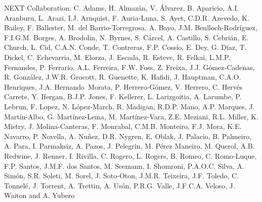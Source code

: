 NEXT Collaboration: C. Adams, H. Almaz\'an, V. \'Alvarez, B. Aparicio, A.I. Aranburu, L. Arazi, I.J. Arnquist, F. Auria-Luna, S. Ayet, C.D.R. Azevedo, K. Bailey, F. Ballester, M. del Barrio-Torregrosa, A. Bayo, J.M. Benlloch-Rodr\'{i}guez, F.I.G.M. Borges, A. Brodolin, N. Byrnes, S. C\'arcel, A. Castillo, S. Cebri\'an, E. Church, L. Cid, C.A.N. Conde, T. Contreras, F.P. Coss\'io, E. Dey, G. D\'iaz, T. Dickel, C. Echevarria, M. Elorza, J. Escada, R. Esteve, R. Felkai, L.M.P. Fernandes, P. Ferrario, A.L. Ferreira, F.W. Foss, Z. Freixa, J.J. G\'omez-Cadenas, R. Gonz\'alez, J.W.R. Grocott, R. Guenette, K. Hafidi, J. Hauptman, C.A.O. Henriques, J.A. Hernando~Morata, P. Herrero-G\'omez, V. Herrero, C. Herv\'es Carrete, Y. Ifergan, B.J.P. Jones, F. Kellerer, L. Larizgoitia, A. Larumbe, P. Lebrun, F. Lopez, N. L\'opez-March, R. Madigan, R.D.P. Mano, A.P. Marques, J. Mart\'in-Albo, G. Mart\'inez-Lema, M. Mart\'inez-Vara, Z.E. Meziani, R.L. Miller, K. Mistry, J. Molina-Canteras, F. Monrabal, C.M.B. Monteiro, F.J. Mora, K.E. Navarro, P. Novella, A. Nu\~{n}ez, D.R. Nygren, E. Oblak, J. Palacio, B. Palmeiro, A. Para, I. Parmaksiz, A. Pazos, J. Pelegrin, M. P\'erez Maneiro, M. Querol, A.B. Redwine, J. Renner, I. Rivilla, C. Rogero, L. Rogers, B. Romeo, C. Romo-Luque, F.P. Santos, J.M.F. dos Santos, M. Seemann, I. Shomroni, P.A.O.C. Silva, A. Sim\'on, S.R. Soleti, M. Sorel, J. Soto-Oton, J.M.R. Teixeira, J.F. Toledo, C. Tonnel\'e, J. Torrent, A. Trettin, A. Us\'on, P.R.G. Valle, J.F.C.A. Veloso, J. Waiton and A. Yubero